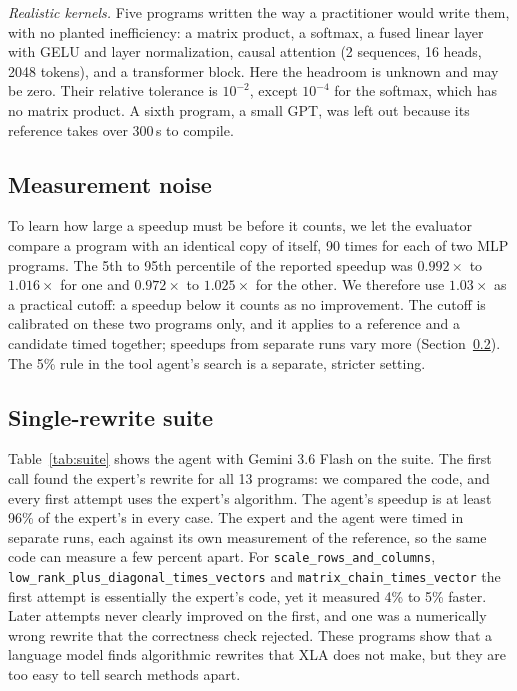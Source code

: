 \documentclass[conference]{IEEEtran}
\begin{document}
\emph{Realistic kernels.} Five programs written the way a practitioner would
write them, with no planted inefficiency: a matrix product, a softmax, a
fused linear layer with GELU and layer normalization, causal attention
(2 sequences, 16 heads, 2048 tokens), and a transformer block. Here the
headroom is unknown and may be zero. Their relative tolerance is $10^{-2}$,
except $10^{-4}$ for the softmax, which has no matrix product. A sixth
program, a small GPT, was left out because its reference takes over 300\,s to
compile.

\subsection{Measurement noise}
To learn how large a speedup must be before it counts, we let the evaluator
compare a program with an identical copy of itself, 90 times for each of two
MLP programs. The 5th to 95th percentile of the reported speedup was
$0.992\times$ to $1.016\times$ for one and $0.972\times$ to $1.025\times$
for the other. We therefore use $1.03\times$ as a practical cutoff: a speedup below it
counts as no improvement. The cutoff is calibrated on these two programs
only, and it applies to a reference and a candidate timed together; speedups
from separate runs vary more (Section~\ref{sec:suite}). The 5\% rule in the
tool agent's search is a separate, stricter setting.

\subsection{Single-rewrite suite}
\label{sec:suite}
Table~\ref{tab:suite} shows the agent with Gemini 3.6 Flash on the suite.
The first call found the expert's rewrite for all 13 programs: we compared
the code, and every first attempt uses the expert's algorithm. The agent's
speedup is at least 96\% of the expert's in every case. The expert and the
agent were timed in separate runs, each against its own measurement of the
reference, so the same code can measure a few percent apart. For
\texttt{scale\_rows\_and\_columns}, \texttt{low\_rank\_plus\_diagonal\_times\_vectors}
and \texttt{matrix\_chain\_times\_vector} the first attempt is essentially
the expert's code, yet it measured 4\% to 5\% faster. Later attempts never clearly
improved on the first, and one was a numerically wrong rewrite that the
correctness check rejected. These programs show that a language model
finds algorithmic rewrites that XLA does not make, but they are too easy to
tell search methods apart.
\end{document}
